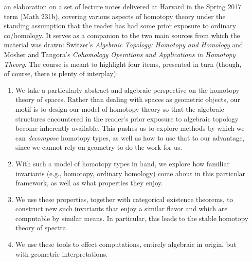 
\maketitle

 an elaboration on a set of lecture notes delivered at Harvard in the Spring 2017 term (Math 231b), covering various aspects of homotopy theory under the standing assumption that the reader has had some prior exposure to ordinary co/homology.\cite{Hatcher}  It serves as a companion to the two main sources from which the material was drawn: Switzer's \textit{Algebraic Topology: Homotopy and Homology}\cite{Switzer} and Mosher and Tangora's \textit{Cohomology Operations and Applications in Homotopy Theory}.\cite{MosherTangora}  The course is meant to highlight four items, presented in turn (though, of course, there is plenty of interplay):

\begin{enumerate}
    \item We take a particularly abstract and algebraic perspective on the homotopy theory of spaces.  Rather than dealing with spaces as geometric objects, our motif is to design our model of homotopy theory so that the algebraic structures encountered in the reader's prior exposure to algebraic topology become inherently available.  This pushes us to explore methods by which we can \emph{decompose} homotopy types, as well as how to use that to our advantage, since we cannot rely on geometry to do the work for us.\label{DecompGoal}
    \item With such a model of homotopy types in hand, we explore how familiar invariants (e.g., homotopy, ordinary homology) come about in this particular framework, as well as what properties they enjoy.\label{InvariantsGoal}
    \item We use these properties, together with categorical existence theorems, to construct new such invariants that enjoy a similar flavor and which are computable by similar means.  In particular, this leads to the stable homotopy theory of spectra.\label{RepresentabilityGoal}
    \item We use these tools to effect computations, entirely algebraic in origin, but with geometric interpretations.\label{ComputationsGoal}
\end{enumerate}

